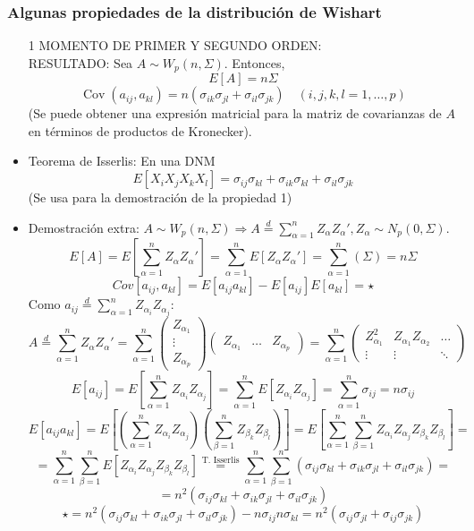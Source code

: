 \documentclass[11pt,a4paper]{article}
\begin{document}
\subsubsection{Algunas propiedades de la distribución de Wishart}
\begin{itemize}
\item[1] MOMENTO DE PRIMER Y SEGUNDO ORDEN: \\
RESULTADO: Sea $A \sim W_{p}(n, \Sigma)$. Entonces,
$$E[A] = n \Sigma$$
$$\operatorname{Cov}(a_{ij}, a_{kl}) = n(\sigma_{ik}\sigma_{jl} + \sigma_{il}\sigma_{jk}) \quad (i, j, k, l = 1, \dots, p)$$
(Se puede obtener una expresión matricial para la matriz de covarianzas de $A$ en términos de productos de Kronecker).

\item Teorema de Isserlis: En una DNM
$$E[X_{i}X_{j}X_{k}X_{l}] = \sigma_{ij}\sigma_{kl} + \sigma_{ik}\sigma_{kl} + \sigma_{il}\sigma_{jk}$$
(Se usa para la demostración de la propiedad 1)

\item Demostración extra: $A \sim W_{p}(n, \Sigma) \Rightarrow A \overset{d}{=} \sum_{\alpha=1}^{n} Z_{\alpha}Z_{\alpha}', Z_{\alpha} \sim N_{p}(0, \Sigma)$.
$$E[A] = E[\sum_{\alpha=1}^{n} Z_{\alpha}Z_{\alpha}'] = \sum_{\alpha=1}^{n} E[Z_{\alpha}Z_{\alpha}'] = \sum_{\alpha=1}^{n}(\Sigma) = n\Sigma$$
$$Cov[a_{ij}, a_{kl}] = E[a_{ij}a_{kl}] - E[a_{ij}]E[a_{kl}] = \star$$
Como $a_{ij} \overset{d}{=} \sum_{\alpha=1}^{n} Z_{\alpha_{i}}Z_{\alpha_{j}}$:
$$A \overset{d}{=} \sum_{\alpha=1}^{n} Z_{\alpha}Z_{\alpha}' = \sum_{\alpha=1}^{n} \begin{pmatrix} Z_{\alpha_{1}} \\ \vdots \\ Z_{\alpha_{p}} \end{pmatrix} \begin{pmatrix} Z_{\alpha_{1}} & \dots & Z_{\alpha_{p}} \end{pmatrix} = \sum_{\alpha=1}^{n} \begin{pmatrix}
Z_{\alpha_{1}}^{2} & Z_{\alpha_{1}}Z_{\alpha_{2}} & \dots \\
\vdots & \vdots & \ddots
\end{pmatrix}$$
$$E[a_{ij}] = E[\sum_{\alpha=1}^{n}Z_{\alpha_{i}}Z_{\alpha_{j}}] = \sum_{\alpha=1}^{n} E[Z_{\alpha_{i}}Z_{\alpha_{j}}] = \sum_{\alpha=1}^{n} \sigma_{ij} = n\sigma_{ij}$$
$$E[a_{ij}a_{kl}] = E[(\sum_{\alpha=1}^{n} Z_{\alpha_{i}}Z_{\alpha_{j}})(\sum_{\beta=1}^{n}Z_{\beta_{k}}Z_{\beta_{l}})] = E[\sum_{\alpha=1}^{n} \sum_{\beta=1}^{n} Z_{\alpha_{i}}Z_{\alpha_{j}} Z_{\beta_{k}} Z_{\beta_{l}}] =$$
$$= \sum_{\alpha=1}^{n} \sum_{\beta=1}^{n} E[Z_{\alpha_{i}} Z_{\alpha_{j}} Z_{\beta_{k}} Z_{\beta_{l}}] \overset{\text{T. Isserlis}}{=} \sum_{\alpha=1}^{n} \sum_{\beta=1}^{n} (\sigma_{ij}\sigma_{kl} + \sigma_{ik}\sigma_{jl} + \sigma_{il}\sigma_{jk}) =$$
$$= n^{2} (\sigma_{ij}\sigma_{kl} + \sigma_{ik}\sigma_{jl} + \sigma_{il}\sigma_{jk})$$
$$\star = n^{2}(\sigma_{ij}\sigma_{kl} + \sigma_{ik}\sigma_{jl} + \sigma_{il}\sigma_{jk}) - n\sigma_{ij}n\sigma_{kl} = n^{2}(\sigma_{ij}\sigma_{jl} + \sigma_{ij}\sigma_{jk})$$


\end{itemize}
\end{document}
